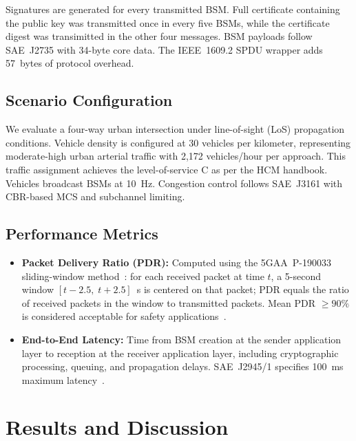 \documentclass[conference]{IEEEtran}
\begin{document}
Signatures are generated for every transmitted BSM. Full certificate containing the public key was transmitted once in every five BSMs, while the certificate digest was transimitted in the other four messages. BSM payloads follow SAE~J2735 with 34-byte core data. The IEEE~1609.2 SPDU wrapper adds 57~bytes of protocol overhead.

\subsection{Scenario Configuration}

We evaluate a four-way urban intersection under line-of-sight (LoS) propagation conditions. Vehicle density is configured at 30 vehicles per kilometer, representing moderate-high urban arterial traffic with 2,172 vehicles/hour per approach. This traffic assignment achieves the level-of-service C as per the HCM handbook. Vehicles broadcast BSMs at 10~Hz. Congestion control follows SAE~J3161 with CBR-based MCS and subchannel limiting.

\subsection{Performance Metrics}

\begin{itemize}
    \item \textbf{Packet Delivery Ratio (PDR):} Computed using the 5GAA~P-190033 sliding-window method~\cite{5gaa_p190033}: for each received packet at time $t$, a 5-second window $[t-2.5,\;t+2.5]$~s is centered on that packet; PDR equals the ratio of received packets in the window to transmitted packets. Mean PDR $\geq 90\%$ is considered acceptable for safety applications~\cite{twardokus2025chasm}.
    \item \textbf{End-to-End Latency:} Time from BSM creation at the sender application layer to reception at the receiver application layer, including cryptographic processing, queuing, and propagation delays. SAE~J2945/1 specifies 100~ms maximum latency~\cite{sae_j29451}.
\end{itemize}

\section{Results and Discussion}
\end{document}
